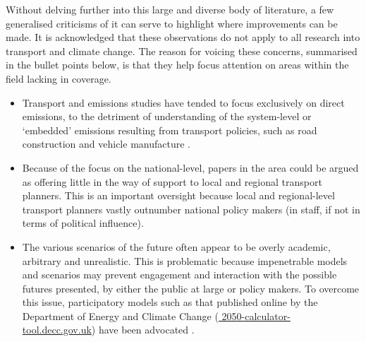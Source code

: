 Without delving further into this large and diverse body of literature,
a few generalised criticisms of it can serve to
highlight where improvements can be made. It is acknowledged that
these observations do not apply to all research into
transport and climate change. The reason for voicing these concerns,
summarised in the bullet points below, is that they
help focus attention on areas within the field lacking in
coverage.
\begin{itemize}
 \item Transport and emissions studies have tended to focus exclusively on
 direct emissions, to the detriment of understanding of the system-level or
 `embedded' emissions resulting from transport policies,
 such as road construction and vehicle
 manufacture \citep{Lenzen1999, Wee2005}.
 \item Because of the focus on the national-level, papers in the area
 could be argued as offering little in the way of support to local and regional transport
 planners. This is an important oversight because local and regional-level
 transport planners vastly outnumber national policy makers (in staff, if not
 in terms of political influence).
 \item The various scenarios of the future often appear to be overly academic,
 arbitrary and unrealistic. This is
 problematic because impenetrable models and scenarios
 may prevent engagement and interaction with the
 possible futures presented, by either the public at large or policy makers.
 To overcome this issue, participatory models
 such as that published online by the Department of Energy and Climate Change
 (\href{http://2050-calculator-tool.decc.gov.uk/pathways/11111111111111111111111111111111111111111111111111111/primary_energy_chart}
 {\color{blue} 2050-calculator-tool.decc.gov.uk}) have been advocated
 \citep{fulton2012exploring}.
\end{itemize}

